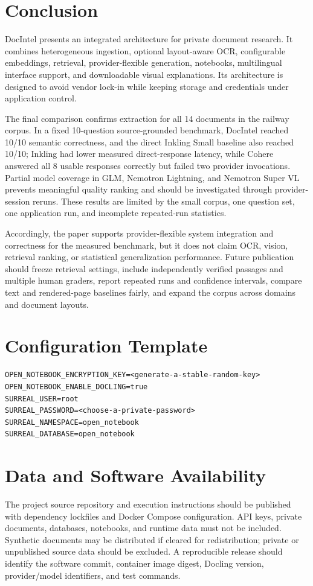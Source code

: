 \documentclass[conference]{IEEEtran}
\begin{document}
\balance
\section{Conclusion}
DocIntel presents an integrated architecture for private document research. It combines heterogeneous ingestion, optional layout-aware OCR, configurable embeddings, retrieval, provider-flexible generation, notebooks, multilingual interface support, and downloadable visual explanations. Its architecture is designed to avoid vendor lock-in while keeping storage and credentials under application control.

The final comparison confirms extraction for all 14 documents in the railway corpus. In a fixed 10-question source-grounded benchmark, DocIntel reached 10/10 semantic correctness, and the direct Inkling Small baseline also reached 10/10; Inkling had lower measured direct-response latency, while Cohere answered all 8 usable responses correctly but failed two provider invocations. Partial model coverage in GLM, Nemotron Lightning, and Nemotron Super VL prevents meaningful quality ranking and should be investigated through provider-session reruns. These results are limited by the small corpus, one question set, one application run, and incomplete repeated-run statistics.

Accordingly, the paper supports provider-flexible system integration and correctness for the measured benchmark, but it does not claim OCR, vision, retrieval ranking, or statistical generalization performance. Future publication should freeze retrieval settings, include independently verified passages and multiple human graders, report repeated runs and confidence intervals, compare text and rendered-page baselines fairly, and expand the corpus across domains and document layouts.

\appendices
\section{Configuration Template}
\begin{lstlisting}[caption={Illustrative environment template}]
OPEN_NOTEBOOK_ENCRYPTION_KEY=<generate-a-stable-random-key>
OPEN_NOTEBOOK_ENABLE_DOCLING=true
SURREAL_USER=root
SURREAL_PASSWORD=<choose-a-private-password>
SURREAL_NAMESPACE=open_notebook
SURREAL_DATABASE=open_notebook
\end{lstlisting}

\section{Data and Software Availability}
The project source repository and execution instructions should be published with dependency lockfiles and Docker Compose configuration. API keys, private documents, databases, notebooks, and runtime data must not be included. Synthetic documents may be distributed if cleared for redistribution; private or unpublished source data should be excluded. A reproducible release should identify the software commit, container image digest, Docling version, provider/model identifiers, and test commands.
\end{document}
